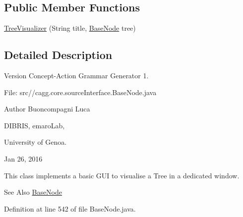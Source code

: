 \subsection*{Public Member Functions}
\begin{DoxyCompactItemize}
\item 
\hyperlink{classit_1_1emarolab_1_1cagg_1_1core_1_1BaseNode_1_1TreeVisualizer_a4fac42b03f60921d86ab732ff3915414}{Tree\-Visualizer} (String title, \hyperlink{classit_1_1emarolab_1_1cagg_1_1core_1_1BaseNode}{Base\-Node} tree)
\end{DoxyCompactItemize}


\subsection{Detailed Description}
\begin{DoxyVersion}{Version}
Concept-\/\-Action Grammar Generator 1. \par
 File\-: src//cagg.core.\-source\-Interface.\-Base\-Node.\-java \par

\end{DoxyVersion}
\begin{DoxyAuthor}{Author}
Buoncompagni Luca \par
 D\-I\-B\-R\-I\-S, emaro\-Lab,\par
 University of Genoa. \par
 Jan 26, 2016 \par

\end{DoxyAuthor}


This class implements a basic G\-U\-I to visualise a Tree in a dedicated window. 

\begin{DoxySeeAlso}{See Also}
\hyperlink{classit_1_1emarolab_1_1cagg_1_1core_1_1BaseNode}{Base\-Node} 
\end{DoxySeeAlso}


Definition at line 542 of file Base\-Node.\-java.




